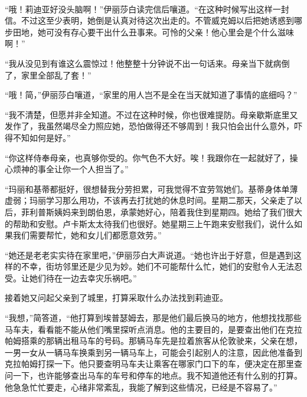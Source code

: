 \par “哦！莉迪亚好没头脑啊！”伊丽莎白读完信后嚷道。“在这种时候写出这样一封信。不过这至少表明，她倒是认真对待这次出走的。不管威克姆以后把她诱惑到哪步田地，她可没有存心要干出什么丑事来。可怜的父亲！他心里会是个什么滋味啊！”
\par “我从没见到有谁这么震惊过！他整整十分钟说不出一句话来。母亲当下就病倒了，家里全部乱了套！”
\par “哦！简，”伊丽莎白嚷道，“家里的用人岂不是全在当天就知道了事情的底细吗？”
\par “我不清楚，但愿并非全知道。不过在这种时候，你也很难提防。母亲歇斯底里又发作了，我虽然竭尽全力照应她，恐怕做得还不够周到！我只怕会出什么意外，吓得不知如何是好。”
\par “你这样侍奉母亲，也真够你受的。你气色不大好。唉！我跟你在一起就好了，操心烦神的事全让你一个人担当了。”
\par “玛丽和基蒂都挺好，很想替我分劳担累，可我觉得不宜劳驾她们。基蒂身体单薄虚弱；玛丽学习那么用功，不该再去打扰她的休息时间。星期二那天，父亲走了以后，菲利普斯姨妈来到朗伯恩，承蒙她好心，陪着我住到星期四。她给了我们很大的帮助和安慰。卢卡斯太太待我们也很好。她星期三上午跑来安慰我们，说什么如果我们需要帮忙，她和女儿们都愿意效劳。”
\par “她还是老老实实待在家里吧，”伊丽莎白大声说道。“她也许出于好意，但是遇到这样的不幸，街坊邻里还是少见为妙。她们不可能帮什么忙，她们的安慰令人无法忍受。让她们待在一边去幸灾乐祸吧。”
\par 接着她又问起父亲到了城里，打算采取什么办法找到莉迪亚。
\par “我想，”简答道，“他打算到埃普瑟姆去，那是他们最后换马的地方，他想找找那些马车夫，看看能不能从他们嘴里探听点消息。他的主要目的，是要查出他们在克拉帕姆搭乘的那辆出租马车的号码。那辆马车先是拉着旅客从伦敦驶来，父亲在想，一男一女从一辆马车换乘到另一辆马车上，可能会引起别人的注意，因此他准备到克拉帕姆打探一下。他只要查明马车夫让乘客在哪家门口下的车，便决定在那里查问一下，也许能够查出马车的车号和停车的地点。我不知道他还有什么别的打算。他急急忙忙要走，心绪非常紊乱，我能了解到这些情况，已经是不容易了。”



